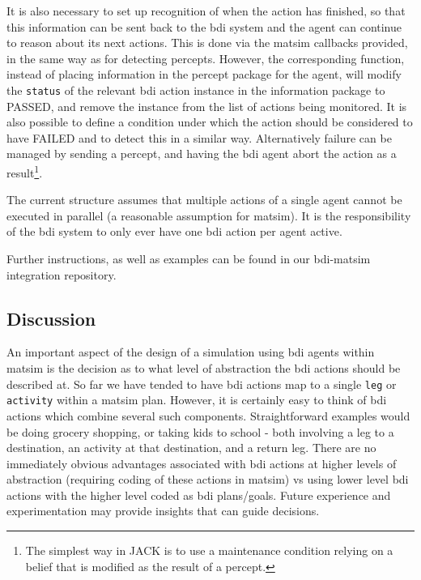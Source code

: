 It is also necessary to set up recognition of when the action has
finished, so that this information can be sent back to the \gls{bdi} system
and the agent can continue to reason about its next actions.  This is
done via the \gls{matsim} callbacks provided, in the same way as for
detecting percepts. However, the corresponding function, instead of
placing information in the percept package for the agent, will modify
the \lstinline{status} of the relevant \gls{bdi} action instance in the
information package to PASSED, and remove the instance from the list
of actions being monitored. It is also possible to define a condition
under which the action should be considered to have FAILED
and to detect this in a similar way. Alternatively failure can be
managed by sending a percept, and having the \gls{bdi} agent abort the
action as a result\footnote{The simplest way in JACK is to use a
  maintenance condition relying on a belief that is modified as the
  result of a percept.}.

The current structure assumes that multiple actions of a single agent
cannot be executed in parallel (a reasonable assumption for
\gls{matsim}). It is the responsibility of the \gls{bdi} system to only ever have
one \gls{bdi} action per agent active.

Further instructions, as well as examples can be found in our
\gls{bdi}-\gls{matsim} integration repository.

\subsection{Discussion}
An important aspect of the design of a simulation using \gls{bdi} agents
within \gls{matsim} is the decision as to what level of abstraction the \gls{bdi}
actions should be described at. So far we have tended to have \gls{bdi}
actions map to a single \lstinline{leg} or \lstinline{activity} within a
\gls{matsim} plan. However, it is certainly easy to think of \gls{bdi} actions
which combine several such components. Straightforward examples would
be doing grocery shopping, or taking kids to school - both involving a
leg to a destination, an activity at that destination, and a return
leg. There are no immediately obvious advantages associated with \gls{bdi}
actions at higher levels of abstraction (requiring coding of these
actions in \gls{matsim}) vs using lower level \gls{bdi} actions with the higher
level coded as \gls{bdi} plans/goals. Future experience and experimentation
may provide insights that can guide decisions.

